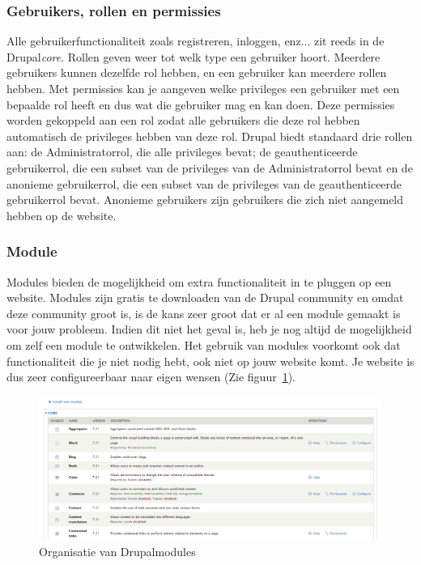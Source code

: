 \subsubsection{Gebruikers, rollen en permissies}
Alle gebruikerfunctionaliteit zoals registreren, inloggen, enz... zit reeds in de Drupal\textit{core}. Rollen geven weer tot welk type een gebruiker hoort. Meerdere gebruikers kunnen dezelfde rol hebben, en een gebruiker kan meerdere rollen hebben. Met permissies kan je aangeven welke privileges een gebruiker met een bepaalde rol heeft en dus wat die gebruiker mag en kan doen. Deze permissies worden gekoppeld aan een rol zodat alle gebruikers die deze rol hebben automatisch de privileges hebben van deze rol. Drupal biedt standaard drie rollen aan: de Administratorrol, die alle privileges bevat; de geauthenticeerde gebruikerrol, die een subset van de privileges van de Administratorrol bevat en de anonieme gebruikerrol, die een subset van de privileges van de geauthenticeerde gebruikerrol bevat. Anonieme gebruikers zijn gebruikers die zich niet aangemeld hebben op de website.

\subsubsection{Module}
Modules bieden de mogelijkheid om extra functionaliteit in te pluggen op een website. Modules zijn gratis te downloaden van de Drupal community en omdat deze community groot is, is de kans zeer groot dat er al een module gemaakt is voor jouw probleem. Indien dit niet het geval is, heb je nog altijd de mogelijkheid om zelf een module te ontwikkelen. Het gebruik van modules voorkomt ook dat functionaliteit die je niet nodig hebt, ook niet op jouw website komt. Je website is dus zeer configureerbaar naar eigen wensen (Zie figuur~\ref{fig:drupalOrganizeModules}).
\begin{figure}[h]
\includegraphics[width=1\textwidth]{fig/drupalOrganizeModules}
\caption{Organisatie van Drupalmodules}
\label{fig:drupalOrganizeModules}
\end{figure}

